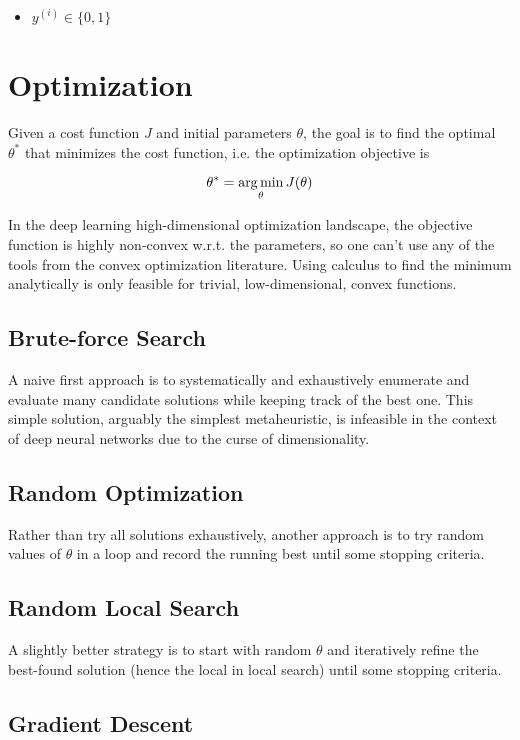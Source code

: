 \begin{itemize}
    \item $y^{(i)} \in \{0, 1\}$
\end{itemize}


\section{Optimization}

Given a cost function $J$ and initial parameters $\theta$, the goal is to find the optimal $\theta^*$ that minimizes the cost function, i.e. the optimization objective is

$$
\theta^{*} = \operatorname*{arg\,min}_{\theta} J(\theta)
$$

In the deep learning high-dimensional optimization landscape, the objective function is highly non-convex w.r.t. the parameters, so one can't use any of the tools from the convex optimization literature. Using calculus to find the minimum analytically is only feasible for trivial, low-dimensional, convex functions.

\subsection{Brute-force Search}

A naive first approach is to systematically and exhaustively enumerate and evaluate many candidate solutions while keeping track of the best one. This simple solution, arguably the simplest metaheuristic, is infeasible in the context of deep neural networks due to the curse of dimensionality.

\subsection{Random Optimization}

Rather than try all solutions exhaustively, another approach is to try random values of $\theta$ in a loop and record the running best until some stopping criteria.

\subsection{Random Local Search}

A slightly better strategy is to start with random $\theta$ and iteratively refine the best-found solution (hence the local in local search) until some stopping criteria.

\subsection{Gradient Descent}

